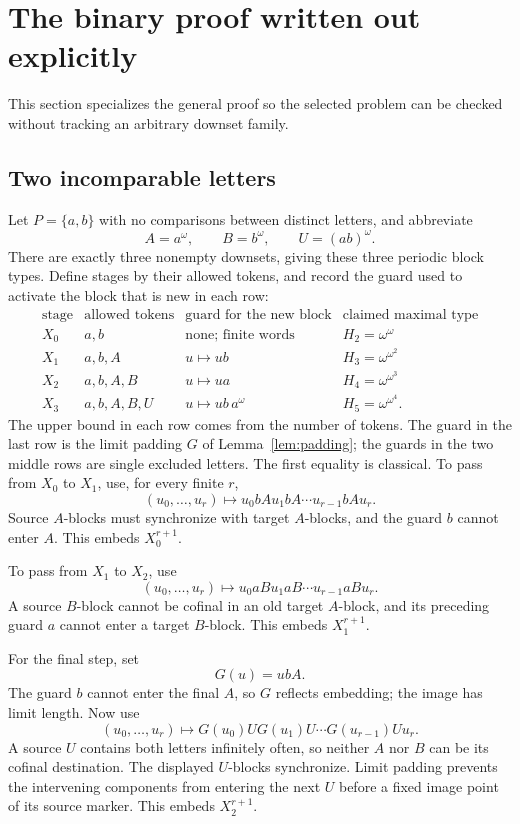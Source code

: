 \documentclass[11pt,a4paper]{article}
\numberwithin{equation}{section}
\theoremstyle{definition}
\theoremstyle{remark}
\begin{document}
\section{The binary proof written out explicitly}
\label{sec:binary}

This section specializes the general proof so the selected problem can be
checked without tracking an arbitrary downset family.

\subsection{Two incomparable letters}
Let $P=\{a,b\}$ with no comparisons between distinct letters, and abbreviate
\[
 A=a^\omega,\qquad B=b^\omega,\qquad U=(ab)^\omega.
\]
There are exactly three nonempty downsets, giving these three periodic
block types. Define stages by their allowed tokens, and record the guard used
to activate the block that is new in each row:
\[
 \begin{array}{c|c|c|c}
  \text{stage}&\text{allowed tokens}&\text{guard for the new block}
    &\text{claimed maximal type}\\\hline
  X_0&a,b&\text{none; finite words}&H_2=\omega^{\omega}\\
  X_1&a,b,A&u\mapsto ub&H_3=\omega^{\omega^2}\\
  X_2&a,b,A,B&u\mapsto ua&H_4=\omega^{\omega^3}\\
  X_3&a,b,A,B,U&u\mapsto ub\,a^\omega&H_5=\omega^{\omega^4}.
 \end{array}
\]
The upper bound in each row comes from the number of tokens. The guard in the
last row is the limit padding $G$ of Lemma~\ref{lem:padding}; the guards in
the two middle rows are single excluded letters.
The first equality is classical. To pass from $X_0$ to $X_1$, use, for
every finite $r$,
\[
 (u_0,\ldots,u_r)\longmapsto
 u_0bAu_1bA\cdots u_{r-1}bAu_r.
\]
Source $A$-blocks must synchronize with target $A$-blocks, and the guard
$b$ cannot enter $A$. This embeds $X_0^{r+1}$.

To pass from $X_1$ to $X_2$, use
\[
 (u_0,\ldots,u_r)\longmapsto
 u_0aBu_1aB\cdots u_{r-1}aBu_r.
\]
A source $B$-block cannot be cofinal in an old target $A$-block, and its
preceding guard $a$ cannot enter a target $B$-block. This embeds
$X_1^{r+1}$.

For the final step, set
\[
 G(u)=ubA.
\]
The guard $b$ cannot enter the final $A$, so $G$ reflects embedding; the
image has limit length. Now use
\[
 (u_0,\ldots,u_r)\longmapsto
 G(u_0)U G(u_1)U\cdots G(u_{r-1})Uu_r.
\]
A source $U$ contains both letters infinitely often, so neither $A$ nor
$B$ can be its cofinal destination. The displayed $U$-blocks synchronize.
Limit padding prevents the intervening components from entering the next
$U$ before a fixed image point of its source marker. This embeds
$X_2^{r+1}$.
\end{document}
